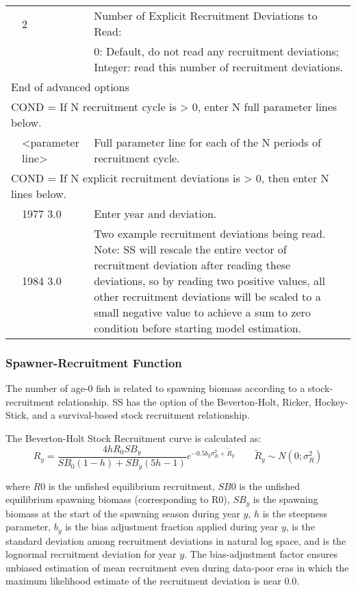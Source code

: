 \begin{longtable}{p{1cm} p{3cm} p{11cm}}
	\Tstrut & 2    & Number of Explicit Recruitment Deviations to Read:\\
			&      & 0: Default, do not read any recruitment deviations; Integer: read this number of recruitment deviations.\\
	
	\multicolumn{3}{l}{End of advanced options}\Tstrut\Bstrut\\
	\hline

	\multicolumn{3}{l}{COND = If N recruitment cycle is > 0, enter N full parameter lines below.}\Tstrut\\
	\Tstrut & <parameter line> & Full parameter line for each of the N periods of recruitment cycle.\Bstrut\\
	\hline

	\multicolumn{3}{l}{COND = If N explicit recruitment deviations is > 0, then enter N lines below.}\Tstrut\Bstrut\\
	& 1977 3.0 & Enter year and deviation.\\
	& 1984 3.0 & Two example recruitment deviations being read.  Note: SS will rescale the entire vector of recruitment deviation after reading these deviations, so by reading two positive values, all other recruitment deviations will be scaled to a small negative value to achieve a sum to zero condition before starting model estimation.\Bstrut\\
	\hline
\end{longtable}

\subsubsection{Spawner-Recruitment Function}
The number of age-0 fish is related to spawning biomass according to a stock-recruitment relationship.  SS has the option of the Beverton-Holt, Ricker, Hockey-Stick, and a survival-based stock recruitment relationship.

The Beverton-Holt Stock Recruitment curve is calculated as:
	\begin{equation}{R_y = \frac{4hR_0SB_y}{SB_0(1-h)+SB_y(5h-1)}e^{-0.5b_y\sigma^2_R+\tilde{R}_y}\qquad  \tilde{R}_y\sim N(0;\sigma^2_R)}
	\end{equation}
	
where $R0$ is the unfished equilibrium recruitment, $SB0$ is the unfished equilibrium spawning biomass (corresponding to R0), $SB_y$ is the spawning biomass at the start of the spawning season during year $y$, $h$ is the steepness parameter, $b_y$ is the bias adjustment fraction applied during year $y$, is the standard deviation among recruitment deviations in natural log space, and is the lognormal recruitment deviation for year $y$. The bias-adjustment factor \citep{methot_adjusting_2011} ensures unbiased estimation of mean recruitment even during data-poor eras in which the maximum likelihood estimate of the recruitment deviation is near 0.0.

